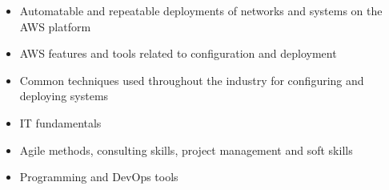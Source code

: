 \documentclass[6pt,a4paper,ragged2e,withhyper]{altacv}
\begin{document}
\begin{paracol}{2}
    \smallskip



    \begin{itemize}
      \item Automatable and repeatable deployments of networks and systems on the AWS platform
      \item AWS features and tools related to configuration and deployment
      \item Common techniques used throughout the industry for configuring and deploying systems
    \end{itemize}

    \vspace{-0.3cm}\divider


    \begin{itemize}
      \item IT fundamentals
      \item Agile methods, consulting skills, project management and soft skills
      \item Programming and DevOps tools
    \end{itemize}

    \switchcolumn


    \\

    \smallskip


    \cvtag{\LaTeX}

    \smallskip




\end{paracol}
\end{document}
